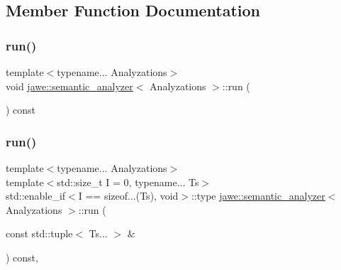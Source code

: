 \subsection{Member Function Documentation}
\mbox{\label{classjawe_1_1semantic__analyzer_a8a973f50059623550c152c1b253aea4b}} 
\subsubsection{\texorpdfstring{run()}{run()}\hspace{0.1cm}{\footnotesize\ttfamily [1/2]}}
{\footnotesize\ttfamily template$<$typename... Analyzations$>$ \\
void \hyperlink{classjawe_1_1semantic__analyzer}{jawe\+::semantic\+\_\+analyzer}$<$ Analyzations $>$\+::run (\begin{DoxyParamCaption}{ }\end{DoxyParamCaption}) const\hspace{0.3cm}{\ttfamily [inline]}}

\mbox{\label{classjawe_1_1semantic__analyzer_a62b4c2a8c04ae67f57313794655c7448}} 
\subsubsection{\texorpdfstring{run()}{run()}\hspace{0.1cm}{\footnotesize\ttfamily [2/2]}}
{\footnotesize\ttfamily template$<$typename... Analyzations$>$ \\
template$<$std\+::size\+\_\+t I = 0, typename... Ts$>$ \\
std\+::enable\+\_\+if$<$I == sizeof...(Ts), void$>$\+::type \hyperlink{classjawe_1_1semantic__analyzer}{jawe\+::semantic\+\_\+analyzer}$<$ Analyzations $>$\+::run (\begin{DoxyParamCaption}\item[{const std\+::tuple$<$ Ts... $>$ \&}]{ }\end{DoxyParamCaption}) const\hspace{0.3cm}{\ttfamily [inline]}, {\ttfamily [private]}}



